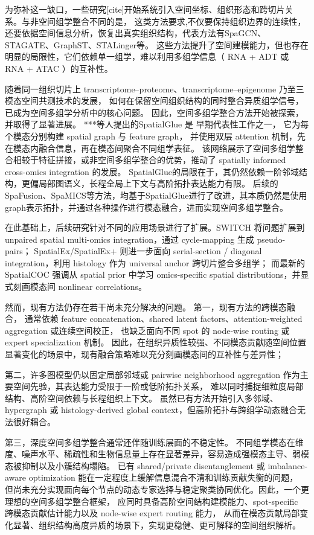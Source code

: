 \documentclass[journal]{IEEEtran}
\begin{document}
为弥补这一缺口，一些研究[cite]开始系统引入空间坐标、组织形态和跨切片关系。与非空间组学整合不同的是，
这类方法要求,不仅要保持组织边界的连续性，还要依据空间信息分析，恢复出真实组织结构，代表方法有SpaGCN、STAGATE、GraphST、STALinger等。
这些方法提升了空间建模能力，但也存在明显的局限性，它们依赖单一组学，难以利用多组学信息（ RNA + ADT 或 RNA + ATAC ）的互补性。

随着同一组织切片上 transcriptome–proteome、transcriptome–epigenome 乃至三模态空间共测技术的发展，
如何在保留空间组织结构的同时整合异质组学信号，已成为空间多组学分析中的核心问题。
因此，空间多组学整合方法开始被探索，并取得了显著进展。
***等人提出的SpatialGlue 是 早期代表性工作之一，
它为每个模态分别构建 spatial graph 与 feature graph，
并使用双层 attention 机制，先在模态内融合信息，再在模态间聚合不同组学表征。
该网络展示了空间多组学整合相较于特征拼接，或非空间多组学整合的优势，推动了 spatially informed cross-omics integration 的发展。
SpatialGlue的局限在于，其仍然依赖一阶邻域结构，更偏局部图语义，长程全局上下文与高阶拓扑表达能力有限。
后续的SpaFusion、SpaMICS等方法，均基于SpatialGlue进行了改进，其本质仍然是使用graph表示拓扑，并通过各种操作进行模态融合，进而实现空间多组学整合。

在此基础上，后续研究针对不同的应用场景进行了扩展。SWITCH 将问题扩展到 unpaired spatial multi-omics integration，通过 cycle-mapping 生成 pseudo-pairs；
SpatialEx/SpatialEx+ 则进一步面向 serial-section / diagonal integration，利用 histology 作为 universal anchor 跨切片整合多组学；
而最新的 SpatialCOC 强调从 spatial prior 中学习 omics-specific spatial distributions，并显式刻画模态间 nonlinear correlations。

然而，现有方法仍存在若干尚未充分解决的问题。
第一，现有方法的跨模态融合，
通常依赖 feature concatenation、shared latent factors、attention-weighted aggregation 或连续空间校正，
也缺乏面向不同 spot 的 node-wise routing 或 expert specialization 机制。
因此，在组织异质性较强、不同模态贡献随空间位置显著变化的场景中，现有融合策略难以充分刻画模态间的互补性与差异性；

第二，许多图模型仍以固定局部邻域或 pairwise neighborhood aggregation 作为主要空间先验，其表达能力受限于一阶或低阶拓扑关系，
难以同时捕捉细粒度局部结构、高阶空间依赖与长程组织上下文。
虽然已有方法开始引入多邻域、hypergraph 或 histology-derived global context，但高阶拓扑与跨组学动态融合无法很好耦合。

第三，深度空间多组学整合通常还伴随训练层面的不稳定性。
不同组学模态在维度、噪声水平、稀疏性和生物信息量上存在显著差异，容易造成强模态主导、弱模态被抑制以及小簇结构塌陷。
已有 shared/private disentanglement 或 imbalance-aware optimization 能在一定程度上缓解信息混合不清和训练贡献失衡的问题，
但尚未充分实现面向每个节点的动态专家选择与稳定聚类协同优化。因此，一个更理想的空间多组学整合框架，
应同时具备高阶空间结构建模能力、spot-specific 跨模态贡献估计能力以及 node-wise expert routing 能力，
从而在模态贡献局部变化显著、组织结构高度异质的场景下，实现更稳健、更可解释的空间组织解析。
\end{document}
